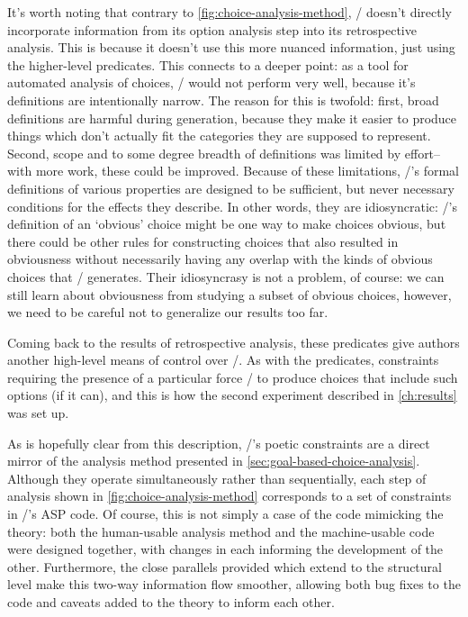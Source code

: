 \begin{enumerate}
    It's worth noting that contrary to \cref{fig:choice-analysis-method}, \dunyazad/ doesn't directly incorporate information from its option analysis step into its retrospective analysis.
    This is because it doesn't use this more nuanced information, just using the higher-level  predicates.
    This connects to a deeper point: as a tool for automated analysis of choices, \dunyazad/ would not perform very well, because it's definitions are intentionally narrow.
    The reason for this is twofold: first, broad definitions are harmful during generation, because they make it easier to produce things which don't actually fit the categories they are supposed to represent.
    Second, scope and to some degree breadth of definitions was limited by effort--with more work, these could be improved.
    Because of these limitations, \dunyazad/'s formal definitions of various properties are designed to be sufficient, but never necessary conditions for the effects they describe.
    In other words, they are idiosyncratic: \dunyazad/'s definition of an `obvious' choice might be one way to make choices obvious, but there could be other rules for constructing choices that also resulted in obviousness without necessarily having any overlap with the kinds of obvious choices that \dunyazad/ generates.
    Their idiosyncrasy is not a problem, of course: we can still learn about obviousness from studying a subset of obvious choices, however, we need to be careful not to generalize our results too far.


    Coming back to the results of retrospective analysis, these  predicates give authors another high-level means of control over \dunyazad/.
    As with the  predicates, constraints requiring the presence of a particular  force \dunyazad/ to produce choices that include such options (if it can), and this is how the second experiment described in \cref{ch:results} was set up.

\end{enumerate}


As is hopefully clear from this description, \dunyazad/'s poetic constraints are a direct mirror of the analysis method presented in \cref{sec:goal-based-choice-analysis}.
%
Although they operate simultaneously rather than sequentially, each step of analysis shown in \cref{fig:choice-analysis-method} corresponds to a set of constraints in \dunyazad/'s ASP code.
%
Of course, this is not simply a case of the code mimicking the theory: both the human-usable analysis method and the machine-usable code were designed together, with changes in each informing the development of the other.
%
Furthermore, the close parallels provided which extend to the structural level make this two-way information flow smoother, allowing both bug fixes to the code and caveats added to the theory to inform each other.

